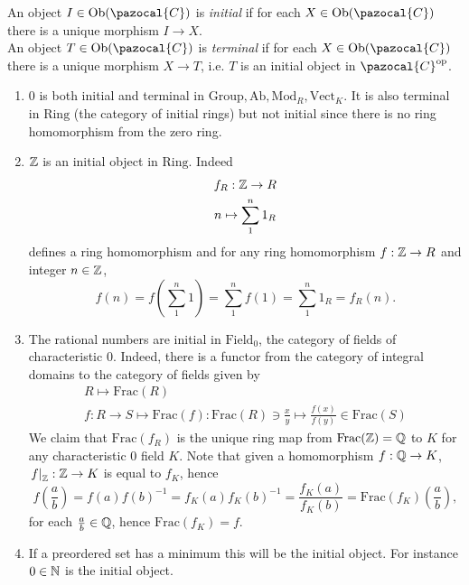     \begin{definition}
        An object $I\in \Ob(\pazocal{C})$ is \emph{initial} if for each $X\in \Ob(\pazocal{C})$ there is a unique morphism $I\rightarrow X$.\\
        An object $T\in \Ob(\pazocal{C})$ is \emph{terminal} if for each $X\in\Ob(\pazocal{C})$ there is a unique morphism $X\rightarrow T$, i.e. $T$ is an initial object in $\pazocal{C}\op$.
    \end{definition}
    \begin{example}
        \begin{enumerate}
            \item $0$ is both initial and terminal in $\mathrm{Group},\mathrm{Ab},\mathrm{Mod}_R,\mathrm{Vect}_K$. It is also terminal in $\mathrm{Ring}$ (the category of initial rings) but not initial since there is no ring homomorphism from the zero ring. 
            \item $\mathbb{Z}$ is an initial object in $\mathrm{Ring}$. Indeed 
            \begin{gather*}
                f_R : \mathbb{Z} \rightarrow R\\
                n \mapsto \sum_1^n 1_R
            \end{gather*}
            defines a ring homomorphism and for any ring homomorphism $f : \mathbb{Z} \rightarrow R$ and integer $n\in\mathbb{Z}$, 
            $$
                f(n)= f\left(\sum_1^n 1 \right) = \sum_1^n f(1)= \sum_1^n 1_R=f_R(n).
            $$
            \item The rational numbers are initial in $\mathrm{Field}_{0}$, the category of fields of characteristic $0$. Indeed, there is a functor from the category of integral domains to the category of fields given by 
            \begin{gather*}
                R\mapsto \mathrm{Frac}(R)\\
                f : R\rightarrow S \mapsto \mathrm{Frac}(f):\mathrm{Frac}(R)\ni\frac{x}{y}\mapsto \frac{f(x)}{f(y)} \in \mathrm{Frac}(S) 
            \end{gather*}
            We claim that $\mathrm{Frac}(f_R)$ is the unique ring map from $\mathrm{Frac}(\mathbb{Z}) = \mathbb{Q}$ to $K$ for any characteristic $0$ field $K$. Note that given a homomorphism $f: \mathbb{Q}\rightarrow K$, $\left. f \right|_{\mathbb{Z}} : \mathbb{Z} \rightarrow K$ is equal to $f_K$, hence 
            $$f(\frac{a}{b})= f(a)f(b)^{-1}=f_K(a)f_K(b)^{-1}=\frac{f_K(a)}{f_K(b)}=\mathrm{Frac}(f_K)(\frac{a}{b}),$$
            for each $\frac{a}{b}\in \mathbb{Q}$, hence $\mathrm{Frac}(f_K)=f$.
            \item If a preordered set has a minimum this will be the initial object. For instance $0\in \mathbb{N}$ is the initial object.

\end{enumerate}
\end{example}
